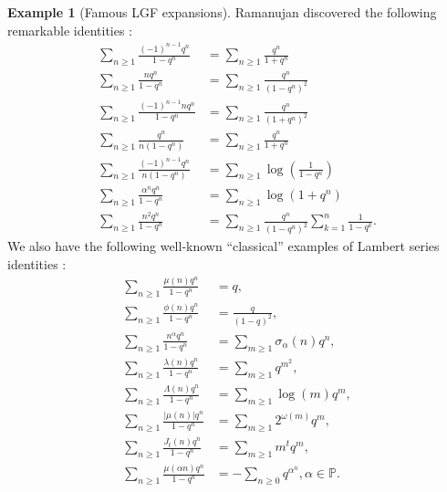 \documentclass[12pt,reqno,a4letter]{article}
\numberwithin{figure}{section}
\numberwithin{table}{section}
\numberwithin{equation}{section}
\theoremstyle{plain}
\numberwithin{theorem}{section}
\theoremstyle{definition}
\newtheorem{example}[theorem]{Example}
\begin{document}
\begin{example}[Famous LGF expansions]
Ramanujan discovered the following remarkable identities 
\cite[\S 2]{RAMANUJAN-LSERIES-SURVEY}: 
\begin{subequations}
\begin{align}
\sum_{n \geq 1} \frac{(-1)^{n-1} q^n}{1-q^n} & = \sum_{n \geq 1} \frac{q^n}{1+q^n} \\ 
\sum_{n \geq 1} \frac{n q^n}{1-q^n} & = \sum_{n \geq 1} \frac{q^n}{(1-q^n)^2} \\ 
\sum_{n \geq 1} \frac{(-1)^{n-1} n q^n}{1-q^n} & = \sum_{n \geq 1} \frac{q^n}{(1+q^n)^2} \\ 
\sum_{n \geq 1} \frac{q^n}{n(1-q^n)} & = \sum_{n \geq 1} \frac{q^n}{1+q^n} \\ 
\sum_{n \geq 1} \frac{(-1)^{n-1} q^n}{n(1-q^n)} & = \sum_{n \geq 1} \log\left(\frac{1}{1-q^n}\right) \\ 
\sum_{n \geq 1} \frac{\alpha^n q^n}{1-q^n} & = \sum_{n \geq 1} \log\left(1+q^n\right) \\ 
\sum_{n \geq 1} \frac{n^2 q^n}{1-q^n} & = \sum_{n \geq 1} \frac{q^n}{(1-q^n)^2} \sum_{k=1}^{n} \frac{1}{1-q^k}. 
\end{align}
\end{subequations}
We also have the following well-known ``classical'' examples of Lambert series identities 
\cite[\S 27.7]{NISTHB} \cite[\S 17.10]{HARDYWRIGHT} \cite[\S 11]{APOSTOLANUMT}:
\begin{subequations}
\begin{align} 
\label{eqn_WellKnown_LamberSeries_Examples} 
\sum_{n \geq 1} \frac{\mu(n) q^n}{1-q^n} & = q, \\ 
\sum_{n \geq 1} \frac{\phi(n) q^n}{1-q^n} & = \frac{q}{(1-q)^2}, \\ 
\sum_{n \geq 1} \frac{n^{\alpha} q^n}{1-q^n} & =  
     \sum_{m \geq 1} \sigma_{\alpha}(n) q^n, \\ 
\sum_{n \geq 1} \frac{\lambda(n) q^n}{1-q^n} & = \sum_{m \geq 1} q^{m^2}, \\ 
\sum_{n \geq 1} \frac{\Lambda(n) q^n}{1-q^n} & = \sum_{m \geq 1} \log(m) q^m, \\ 
\sum_{n \geq 1} \frac{|\mu(n)| q^n}{1-q^n} & = \sum_{m \geq 1} 2^{\omega(m)} q^m, \\ 
\sum_{n \geq 1} \frac{J_t(n) q^n}{1-q^n} & = \sum_{m \geq 1} m^t q^m, \\ 
\sum_{n \geq 1} \frac{\mu(\alpha n) q^n}{1-q^n} & = - \sum_{n \geq 0} q^{\alpha^n}, \alpha \in \mathbb{P}.
\end{align}
\end{subequations}
\end{example}
\end{document}
